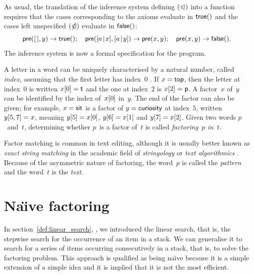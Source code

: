 
As usual, the translation of the inference system defining
\((\mathord{\trianglelefteqslant})\) into a function 
requires that the cases corresponding to the axioms evaluate in
\(\textsf{true}()\) and the cases left unspecified \((\mathord{\ntrianglelefteqslant})\)
evaluate in \(\textsf{false}()\):
\begin{equation*}
\textsf{pre}([\,],y) \rightarrow \textsf{true}();\quad
\textsf{pre}([{a}\!\mid\!{x}],[{a}\!\mid\!{y}]) \rightarrow \textsf{pre}(x,y);\quad
\textsf{pre}(x,y) \rightarrow \textsf{false}().
\end{equation*}
The inference system is now a formal specification for the program.

A letter in a word can be uniquely characterised by a natural number,
called \emph{index}, assuming that the
first letter has index~\(0\) \citep{Dijkstra_1982}. If
\(x=\textsf{top}\), then the letter at index~\(0\) is written
\({x}[{0}]=\textsf{t}\) and the one at index~\(2\) is
\({x}[{2}]=\textsf{p}\). A factor~\(x\) of~\(y\) can be identified by
the index of~\({x}[{0}]\) in~\(y\). The end of the factor can also
be given; for example, \(x=\textsf{sit}\) is a factor of
\(y=\textsf{curiosity}\) at index~\(5\), written \({y}[{5,7}] = x\),
meaning \({y}[{5}] = {x}[{0}]\), \({y}[{6}] = {x}[{1}]\) and
\({y}[{7}] = {x}[{2}]\). Given two words \(p\)~and~\(t\),
determining whether \(p\)~is a factor of~\(t\) is called
\emph{factoring~\(p\) in~\(t\)}.

Factor matching is common in text editing, although it is usually
better known as \emph{exact string matching} in the academic field of
\emph{stringology} or \emph{text
  algorithmics} \citep{CharrasLecroq_2004,CrochemoreHancartLecroq_2007}
\citep[\S{}32]{CLRS_2009}. Because of the asymmetric nature of
factoring, the word~\(p\) is called the \emph{pattern} and the word~\(t\) is the \emph{text}.

\section{Na\"{\i}ve factoring}
\label{sec:naive_factoring}

In section~\ref{def:linear_search}, , we
introduced the linear search, that is, the
stepwise search for the occurrence of an item in a stack. We can
generalise it to search for a series of items occurring consecutively
in a stack, that is, to solve the factoring problem. This approach is
qualified as being na\"{\i}ve because it is a simple extension of a
simple idea and it is implied that it is not the most efficient.

